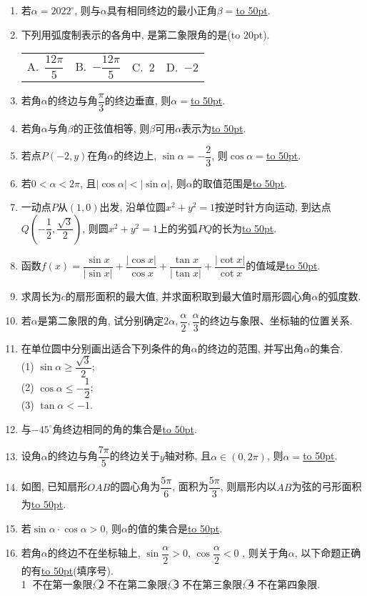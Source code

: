 \documentclass[10pt,a4paper]{article}
\newcommand{\blank}[1]{\underline{\hbox to #1pt{}}}
\newcommand{\bracket}[1]{(\hbox to #1pt{})}
\newcommand{\fourch}[4]{\par\begin{tabular}{p{.23\textwidth}p{.23\textwidth}p{.23\textwidth}p{.23\textwidth}}
A.~#1 &B.~#2& C.~#3& D.~#4
\end{tabular}}
\begin{document}
\begin{enumerate}[1.]
\item 若$\alpha=2022^\circ$, 则与$\alpha$具有相同终边的最小正角$\beta=$\blank{50}.
\item 下列用弧度制表示的各角中, 是第二象限角的是\bracket{20}.
\fourch{$\dfrac{12\pi}5$}{$-\dfrac{12\pi}5$}{$2$}{$-2$}
\item 若角$\alpha$的终边与角$\dfrac{\pi}3$的终边垂直, 则$\alpha=$\blank{50}.
\item 若角$\alpha$与角$\beta$的正弦值相等, 则$\beta$可用$\alpha$表示为\blank{50}.
\item 若点$P(-2,y)$在角$\alpha$的终边上, $\sin\alpha=-\dfrac 23$, 则$\cos\alpha=$\blank{50}.
\item 若$0<\alpha<2\pi$, 且$|\cos\alpha|<|\sin\alpha|$, 则$\alpha$的取值范围是\blank{50}.
\item 一动点$P$从$(1,0)$出发, 沿单位圆$x^2+y^2=1$按逆时针方向运动, 到达点$Q(-\dfrac 12,\dfrac{\sqrt 3}2)$, 则圆$x^2+y^2=1$上的劣弧$PQ$的长为\blank{50}.
\item 函数$f(x)=\dfrac{\sin x}{|\sin x|}+\dfrac{|\cos x|}{\cos x}+\dfrac{\tan x}{|\tan x|}+\dfrac{|\cot x|}{\cot x}$的值域是\blank{50}.
\item 求周长为$c$的扇形面积的最大值, 并求面积取到最大值时扇形圆心角$\alpha$的弧度数.
\item 若$\alpha$是第二象限的角, 试分别确定$2\alpha,\dfrac{\alpha}2,\dfrac{\alpha}3$的终边与象限、坐标轴的位置关系.
\item 在单位圆中分别画出适合下列条件的角$\alpha$的终边的范围, 并写出角$\alpha$的集合.\\
(1) $\sin\alpha\ge \dfrac{\sqrt 3}2$;\\
(2) $\cos\alpha\le -\dfrac 12$;\\
(3) $\tan\alpha<-1$.
\item 与$-45^\circ$角终边相同的角的集合是\blank{50}.
\item 设角$\alpha$的终边与角$\dfrac{7\pi}5$的终边关于$y$轴对称, 且$\alpha\in (0,2\pi)$, 则$\alpha=$\blank{50}.
\item 如图, 已知扇形$OAB$的圆心角为$\dfrac{5\pi}6$, 面积为$\dfrac{5\pi}3$, 则扇形内以$AB$为弦的弓形面积为\blank{50}.
\item 若$\sin\alpha\cdot\cos\alpha>0$, 则$\alpha$的值的集合是\blank{50}.
\item 若角$\alpha$的终边不在坐标轴上, $\sin\dfrac{\alpha}2>0$, $\cos\dfrac{\alpha}2<0$ , 则关于角$\alpha$, 以下命题正确的有\blank{50}(填序号).\\
\textcircled{1} 不在第一象限; \textcircled{2} 不在第二象限; \textcircled{3} 不在第三象限; \textcircled{4} 不在第四象限.

\end{enumerate}
\end{document}
